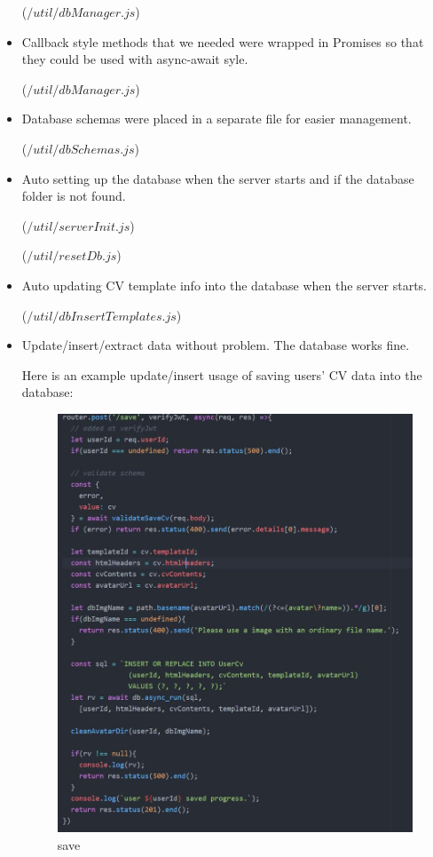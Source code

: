 \documentclass[11pt]{article}
\begin{document}
\begin{spacing}{1.0}
\begin{itemize}
	($/util/dbManager.js$)
	
	\item Callback style methods that we needed were wrapped in Promises so that they could be used with async-await syle.
	
	($/util/dbManager.js$)
	
	\item Database schemas were placed in a separate file for easier management. 
	
	($/util/dbSchemas.js$)
	
	\item Auto setting up the database when the server starts and if the database folder is not found.
	
	($/util/serverInit.js$)
	
	($/util/resetDb.js$)
	
	\item Auto updating CV template info into the database when the server starts.
	
	($/util/dbInsertTemplates.js$)
	
	\item Update/insert/extract data without problem. The database works fine.
	
	Here is an example update/insert usage of saving users' CV data into the database:
	\begin{figure}[H]
	\centering
	\includegraphics[scale=0.5]{figures/db/save.jpg}
	\caption{save}
\end{figure}


\end{itemize}
\end{spacing}
\end{document}
